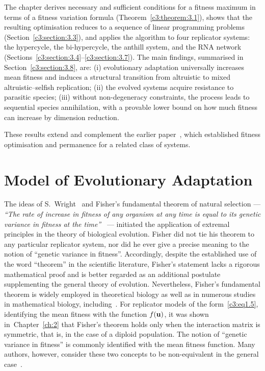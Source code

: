 \documentclass[12pt]{report}
\theoremstyle{definition}
\theoremstyle{remark}
\begin{document}
The chapter derives necessary and sufficient conditions for a fitness maximum in
terms of a fitness variation formula (Theorem~\ref{c3:theorem:3.1}), shows that the
resulting optimisation reduces to a sequence of linear programming problems
(Section~\ref{c3:section:3.3}), and applies the algorithm to four replicator
systems: the hypercycle, the bi-hypercycle, the anthill system, and the RNA
network (Sections~\ref{c3:section:3.4}--\ref{c3:section:3.7}). The main findings,
summarised in Section~\ref{c3:section:3.8}, are: (i) evolutionary adaptation
universally increases mean fitness and induces a structural transition from
altruistic to mixed altruistic--selfish replication; (ii) the evolved systems
acquire resistance to parasitic species; (iii) without non-degeneracy
constraints, the process leads to sequential species annihilation, with a
provable lower bound on how much fitness can increase by dimension reduction.

These results extend and complement the earlier paper~\cite{c3:Drozhzhin2021}, which
established fitness optimisation and permanence for a related class of systems.

\section{Model of Evolutionary Adaptation}\label{c3:section:3.1}
The ideas of S.~Wright~\cite{c3:Wright1930} and Fisher's fundamental theorem of natural selection --- \textit{``The rate of increase in fitness of any organism at any time is equal to its genetic variance in fitness at the time''}~\cite{c3:Fisher1930} --- initiated the application of extremal principles in the theory of biological evolution. Fisher did not tie his theorem to any particular replicator system, nor did he ever give a precise meaning to the notion of ``genetic variance in fitness''. Accordingly, despite the established use of the word ``theorem'' in the scientific literature, Fisher's statement lacks a rigorous mathematical proof and is better regarded as an additional postulate supplementing the general theory of evolution. Nevertheless, Fisher's fundamental theorem is widely employed in theoretical biology as well as in numerous studies in mathematical biology, including~\cite{c3:Crow2002,c3:Dieckmann2004,c3:Ewens2004,c3:Grafen2003}. For replicator models of the form~\eqref{c3:eq1.5}, identifying the mean fitness with the function $f({\bf u})$, it was shown in~Chapter~\ref{ch:2} that Fisher's theorem holds only when the interaction matrix is symmetric, that is, in the case of a diploid population. The notion of ``genetic variance in fitness'' is commonly identified with the mean fitness function. Many authors, however, consider these two concepts to be non-equivalent in the general case~\cite{c3:Ao2005}.
\end{document}
